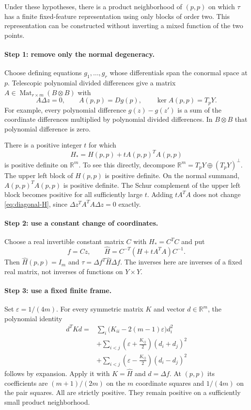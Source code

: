 Under these hypotheses, there is a product neighborhood of $(p,p)$
on which $\tau$ has a finite fixed-feature representation using only
blocks of order two. This representation can be constructed without
inverting a mixed function of the two points.

\paragraph{Step 1: remove only the normal degeneracy.}
Choose defining equations $g_1,\ldots,g_r$ whose differentials span
the conormal space at $p$. Telescopic polynomial divided differences
give a matrix $A\in\operatorname{Mat}_{r\times m}(B\otimes B)$ with
\[
 A\Delta z=0,\qquad
 A(p,p)=Dg(p),\qquad \ker A(p,p)=T_pY.
\]
For example, every polynomial difference $g(z)-g(z')$ is a sum of
the coordinate differences multiplied by polynomial divided
differences. In $B\otimes B$ that polynomial difference is zero.

There is a positive integer $t$ for which
\[
 H_*=H(p,p)+tA(p,p)^TA(p,p)
\]
is positive definite on $\mathbb R^m$. To see this directly, decompose
$\mathbb R^m=T_pY\oplus(T_pY)^\perp$. The upper left block of
$H(p,p)$ is positive definite. On the normal summand,
$A(p,p)^TA(p,p)$ is positive definite. The Schur complement of the
upper left block becomes positive for all sufficiently large $t$.
Adding $tA^TA$ does not change \eqref{eq:diagonal-H}, since
$\Delta z^TA^TA\Delta z=0$ exactly.

\paragraph{Step 2: use a constant change of coordinates.}
Choose a real invertible constant matrix $C$ with $H_*=C^TC$ and put
\[
 f=Cz,\qquad
 \widehat H=C^{-T}(H+tA^TA)C^{-1}.
\]
Then $\widehat H(p,p)=I_m$ and
$\tau=\Delta f^T\widehat H\Delta f$. The inverses here are inverses
of a fixed real matrix, not inverses of functions on $Y\times Y$.

\paragraph{Step 3: use a fixed finite frame.}
Set $\varepsilon=1/(4m)$. For every symmetric matrix $K$ and vector
$d\in\mathbb R^m$, the polynomial identity
\begin{align}
 d^TKd={}&\sum_i\bigl(K_{ii}-2(m-1)\varepsilon\bigr)d_i^2
 \nonumber\\
 &+\sum_{i<j}\left(\varepsilon+\frac{K_{ij}}2\right)(d_i+d_j)^2
 \nonumber\\
 &+\sum_{i<j}\left(\varepsilon-\frac{K_{ij}}2\right)(d_i-d_j)^2
 \label{eq:diagonal-frame}
\end{align}
follows by expansion. Apply it with $K=\widehat H$ and
$d=\Delta f$. At $(p,p)$ its coefficients are
$(m+1)/(2m)$ on the $m$ coordinate squares and $1/(4m)$ on the
pair squares. All are strictly positive. They remain positive on a
sufficiently small product neighborhood.

